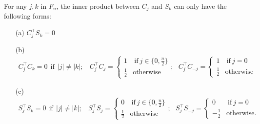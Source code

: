 \begin{lem}
\label{lemma:orthogonal-cos-sin}
For any $j, k$ in $F_n$, the inner product between $C_j$ and $S_k$ can only have the  following forms:
\begin{enumerate}
\item[(a)] $C^{\top}_j S_k = 0$
\item[(b)] 
\begin{equation*}
\begin{aligned}
C_j^\top C_k = 0 ~~\text{if}~~ |j|\neq |k|; ~~~~  C_j^\top C_j = 
\begin{cases}
1 & ~\text{if}~ j\in \{0, \frac{n}{2}\}\\
\frac{1}{2} & \text{otherwise}
\end{cases}; ~~~C_j^\top C_{-j} = 
\begin{cases}
1 & ~\text{if}~ j=0\\
\frac{1}{2} & \text{otherwise}
\end{cases}
\end{aligned}
\end{equation*}
\item[(c)] 
\begin{equation*}
\begin{aligned}
S_j^\top S_k = 0 ~~\text{if}~~ |j|\neq |k|; ~~~~  S_j^\top S_j = 
\begin{cases}
0 & ~\text{if}~ j\in \{0, \frac{n}{2}\}\\
\frac{1}{2} & \text{otherwise}
\end{cases}; ~~~S_j^\top S_{-j} = 
\begin{cases}
0 & ~\text{if}~ j=0\\
-\frac{1}{2} & \text{otherwise}.
\end{cases}
\end{aligned}
\end{equation*}
\end{enumerate}


\end{lem}
